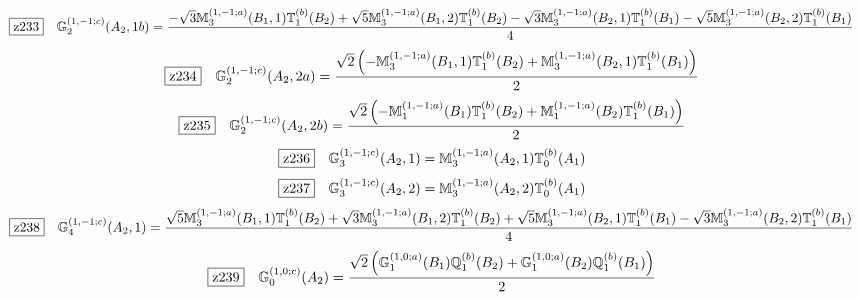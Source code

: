 \documentclass[fleqn,10pt,landscape]{jsarticle}
\begin{document}
\begin{dmath*}
\hspace*{3mm}\fbox{z233}\quad \mathbb{G}_{2}^{(1,-1;c)}(A_{2},1b)=\frac{- \sqrt{3} \mathbb{M}_{3}^{(1,-1;a)}(B_{1},1) \mathbb{T}_{1}^{(b)}(B_{2}) + \sqrt{5} \mathbb{M}_{3}^{(1,-1;a)}(B_{1},2) \mathbb{T}_{1}^{(b)}(B_{2}) - \sqrt{3} \mathbb{M}_{3}^{(1,-1;a)}(B_{2},1) \mathbb{T}_{1}^{(b)}(B_{1}) - \sqrt{5} \mathbb{M}_{3}^{(1,-1;a)}(B_{2},2) \mathbb{T}_{1}^{(b)}(B_{1})}{4}
\end{dmath*}
\begin{dmath*}
\hspace*{3mm}\fbox{z234}\quad \mathbb{G}_{2}^{(1,-1;c)}(A_{2},2a)=\frac{\sqrt{2} \left(- \mathbb{M}_{3}^{(1,-1;a)}(B_{1},1) \mathbb{T}_{1}^{(b)}(B_{2}) + \mathbb{M}_{3}^{(1,-1;a)}(B_{2},1) \mathbb{T}_{1}^{(b)}(B_{1})\right)}{2}
\end{dmath*}
\begin{dmath*}
\hspace*{3mm}\fbox{z235}\quad \mathbb{G}_{2}^{(1,-1;c)}(A_{2},2b)=\frac{\sqrt{2} \left(- \mathbb{M}_{1}^{(1,-1;a)}(B_{1}) \mathbb{T}_{1}^{(b)}(B_{2}) + \mathbb{M}_{1}^{(1,-1;a)}(B_{2}) \mathbb{T}_{1}^{(b)}(B_{1})\right)}{2}
\end{dmath*}
\begin{dmath*}
\hspace*{3mm}\fbox{z236}\quad \mathbb{G}_{3}^{(1,-1;c)}(A_{2},1)=\mathbb{M}_{3}^{(1,-1;a)}(A_{2},1) \mathbb{T}_{0}^{(b)}(A_{1})
\end{dmath*}
\begin{dmath*}
\hspace*{3mm}\fbox{z237}\quad \mathbb{G}_{3}^{(1,-1;c)}(A_{2},2)=\mathbb{M}_{3}^{(1,-1;a)}(A_{2},2) \mathbb{T}_{0}^{(b)}(A_{1})
\end{dmath*}
\begin{dmath*}
\hspace*{3mm}\fbox{z238}\quad \mathbb{G}_{4}^{(1,-1;c)}(A_{2},1)=\frac{\sqrt{5} \mathbb{M}_{3}^{(1,-1;a)}(B_{1},1) \mathbb{T}_{1}^{(b)}(B_{2}) + \sqrt{3} \mathbb{M}_{3}^{(1,-1;a)}(B_{1},2) \mathbb{T}_{1}^{(b)}(B_{2}) + \sqrt{5} \mathbb{M}_{3}^{(1,-1;a)}(B_{2},1) \mathbb{T}_{1}^{(b)}(B_{1}) - \sqrt{3} \mathbb{M}_{3}^{(1,-1;a)}(B_{2},2) \mathbb{T}_{1}^{(b)}(B_{1})}{4}
\end{dmath*}
\begin{dmath*}
\hspace*{3mm}\fbox{z239}\quad \mathbb{G}_{0}^{(1,0;c)}(A_{2})=\frac{\sqrt{2} \left(\mathbb{G}_{1}^{(1,0;a)}(B_{1}) \mathbb{Q}_{1}^{(b)}(B_{2}) + \mathbb{G}_{1}^{(1,0;a)}(B_{2}) \mathbb{Q}_{1}^{(b)}(B_{1})\right)}{2}
\end{dmath*}
\end{document}
